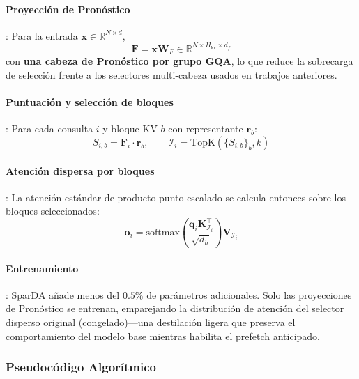 \paragraph{Proyección de Pronóstico}: Para la entrada $\mathbf{x} \in \mathbb{R}^{N \times d}$,
\[
\mathbf{F} = \mathbf{x} \mathbf{W}_F \in \mathbb{R}^{N \times H_{\text{kv}} \times d_f}
\]
con \textbf{una cabeza de Pronóstico por grupo GQA}, lo que reduce la sobrecarga de selección frente a los selectores multi-cabeza usados en trabajos anteriores.

\paragraph{Puntuación y selección de bloques}: Para cada consulta $i$ y bloque KV $b$ con representante $\mathbf{r}_b$:
\[
S_{i,b} = \mathbf{F}_i \cdot \mathbf{r}_b, \qquad \mathcal{I}_i = \mathrm{TopK}(\{S_{i,b}\}_b, k)
\]
\paragraph{Atención dispersa por bloques}: La atención estándar de producto punto escalado se calcula entonces sobre los bloques seleccionados:
\[
\mathbf{o}_i = \mathrm{softmax}\left(\frac{\mathbf{q}_i \mathbf{K}_{\mathcal{I}_i}^\top}{\sqrt{d_h}}\right) \mathbf{V}_{\mathcal{I}_i}
\]
\paragraph{Entrenamiento}: SparDA añade menos del $0.5\%$ de parámetros adicionales. Solo las proyecciones de Pronóstico se entrenan, emparejando la distribución de atención del selector disperso original (congelado)---una destilación ligera que preserva el comportamiento del modelo base mientras habilita el prefetch anticipado.

\subsubsection{Pseudocódigo Algorítmico}

